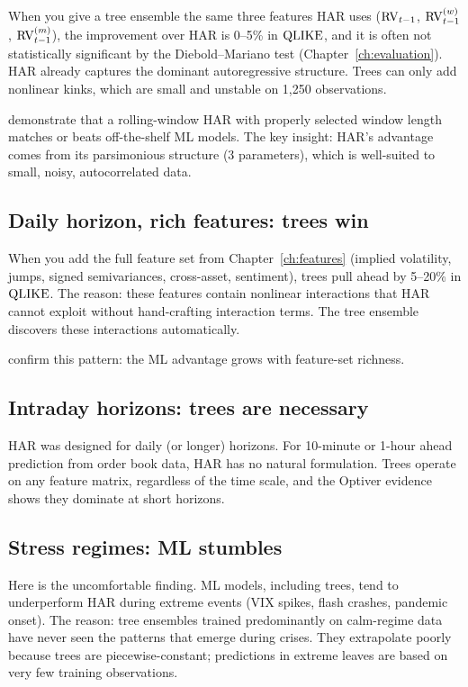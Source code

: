 When you give a tree ensemble the same three features HAR uses ($\operatorname{RV}_{t-1}$,
$\operatorname{RV}^{(w)}_{t-1}$, $\operatorname{RV}^{(m)}_{t-1}$), the improvement over HAR is 0--5\%
in $\operatorname{QLIKE}$, and it is often not statistically significant by the
Diebold--Mariano test (Chapter~\ref{ch:evaluation}).  HAR already captures
the dominant autoregressive structure.  Trees can only add nonlinear kinks,
which are small and unstable on 1,250 observations.

\citet{HARdToBeat2024} demonstrate that a rolling-window HAR with properly
selected window length matches or beats off-the-shelf ML models.  The key
insight: HAR's advantage comes from its parsimonious structure (3 parameters),
which is well-suited to small, noisy, autocorrelated data.

\subsection*{Daily horizon, rich features: trees win}

When you add the full feature set from Chapter~\ref{ch:features} (implied
volatility, jumps, signed semivariances, cross-asset, sentiment), trees pull
ahead by 5--20\% in $\operatorname{QLIKE}$.  The reason: these features contain nonlinear
interactions that HAR cannot exploit without hand-crafting interaction terms.
The tree ensemble discovers these interactions automatically.

\citet{ChristensenSiggaardVeliyev2023} confirm this pattern: the ML
advantage grows with feature-set richness.

\subsection*{Intraday horizons: trees are necessary}

HAR was designed for daily (or longer) horizons.  For 10-minute or 1-hour
ahead prediction from order book data, HAR has no natural formulation.
Trees operate on any feature matrix, regardless of the time scale, and the
Optiver evidence shows they dominate at short horizons.

\subsection*{Stress regimes: ML stumbles}

Here is the uncomfortable finding.  ML models, including trees, tend to
underperform HAR during extreme events (VIX spikes, flash crashes, pandemic
onset).  The reason: tree ensembles trained predominantly on calm-regime
data have never seen the patterns that emerge during crises.  They
extrapolate poorly because trees are piecewise-constant; predictions in
extreme leaves are based on very few training observations.

